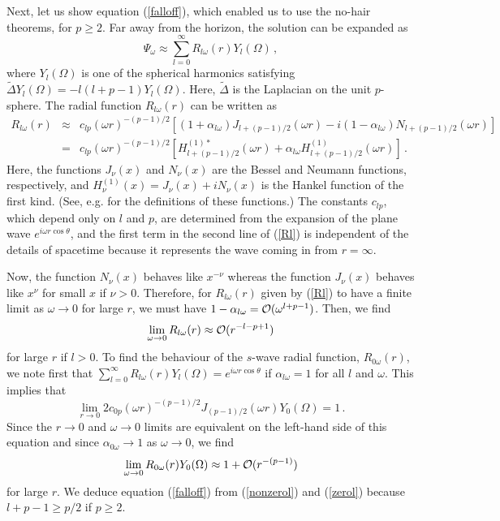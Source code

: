 \documentclass[a4paper,12pt]{article}
\begin{document}
Next, let us show equation (\ref{falloff}), which enabled us to use 
the no-hair theorems, for $p\geq 2$.
Far away from the horizon, the solution can be expanded as
\begin{equation}
\Psi_\omega \approx \sum_{l=0}^\infty R_{l\omega}(r)Y_l(\Omega)\,,
\end{equation}
where $Y_l(\Omega)$ is one of the spherical harmonics satisfying 
$\tilde{\Delta}Y_{l}(\Omega) = -l(l+p-1)Y_{l}(\Omega)$.
Here, $\tilde{\Delta}$ is the Laplacian on the unit $p$-sphere.
The radial function $R_{l\omega}(r)$ can be written as 
\begin{eqnarray}
R_{l\omega}(r) & \approx & c_{lp} (\omega r)^{-(p-1)/2}
\left[ (1+ \alpha_{l\omega})J_{l+(p-1)/2}(\omega r) - i(1-\alpha_{l\omega})
N_{l+(p-1)/2}(\omega r)
\right] \nonumber \\
& = & 
c_{lp} (\omega r)^{-(p-1)/2}
\left[ H^{(1)*}_{l+(p-1)/2}(\omega r) + \alpha_{l\omega} 
H^{(1)}_{l+(p-1)/2}(\omega r)\right]\,. \label{Rl}
\end{eqnarray}
Here, the functions
$J_\nu(x)$ and $N_\nu(x)$ are the Bessel and Neumann functions,
respectively, and 
$H_{\nu}^{(1)}(x) = J_\nu (x) + iN_\nu(x)$
is the Hankel function of the first kind. (See, e.g. \cite{GR} for the
definitions of these functions.)
The constants $c_{lp}$, 
which depend only on $l$ and $p$, are determined from the 
expansion of the plane wave $e^{i\omega r\cos\theta}$, 
and the first term in the second 
line of (\ref{Rl}) is independent of the details of spacetime
because it represents the wave coming
in from $r = \infty$.

Now, the function $N_\nu(x)$ behaves like $x^{-\nu}$
whereas the function $J_\nu(x)$ behaves like $x^\nu$ for small $x$ 
if $\nu > 0$.  
Therefore, for $R_{l\omega}(r)$ given by (\ref{Rl}) to have
a finite limit as $\omega \to 0$ for large $r$, we must have 
$1-\alpha_{l\omega} = {\cal O}(\omega^{l+p-1})$.
Then, we find
\begin{equation}
\lim_{\omega \to 0}R_{l\omega}(r) \approx {\cal O}(r^{-l-p+1}) \label{nonzerol}
\end{equation}
 for large $r$ if $l > 0$.
To find the behaviour of the $s$-wave radial function,
$R_{0\omega}(r)$, we note first that 
$\sum_{l=0}^\infty R_{l\omega}(r)Y_l(\Omega) = e^{i\omega r\cos\theta}$ if
$\alpha_{l\omega} = 1$ for all $l$ and $\omega$.  This implies that
\begin{equation}
\lim_{r\to 0}2c_{0p} (\omega r)^{-(p-1)/2}J_{(p-1)/2}(\omega r)Y_0(\Omega)
= 1\,.
\end{equation}
Since the $r\to 0$ and $\omega \to 0$ limits are equivalent on the 
left-hand side of this equation and since 
$\alpha_{0\omega} \to 1$ as $\omega \to 0$, 
we find
\begin{equation}
\lim_{\omega\to 0}R_{0\omega}(r)Y_0(\Omega) \approx 
1 + {\cal O}(r^{-(p-1)}) \label{zerol}
\end{equation} 
for large $r$.
We deduce equation (\ref{falloff}) from (\ref{nonzerol}) and (\ref{zerol})
because $l+p-1 \geq p/2$ if $p\geq 2$.
\end{document}
